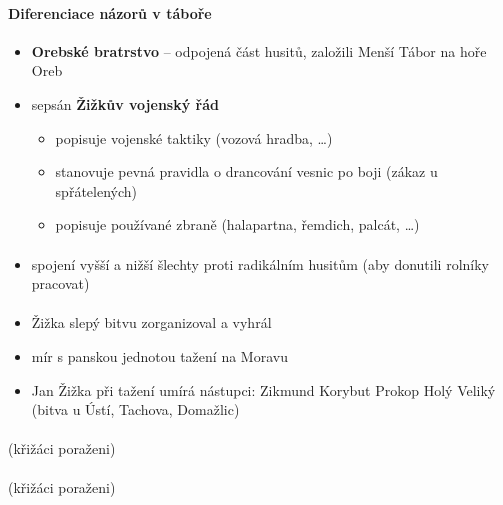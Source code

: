 \paragraph{Diferenciace názorů v táboře}
\begin{itemize}
\item \textbf{Orebské bratrstvo} -- odpojená část husitů, založili Menší Tábor na hoře Oreb
\item sepsán \textbf{Žižkův vojenský řád}
	\begin{itemize}
	\item popisuje vojenské taktiky (vozová hradba, \ldots)
	\item stanovuje pevná pravidla o drancování vesnic po boji (zákaz u spřátelených)
	\item popisuje používané zbraně (halapartna, řemdich, palcát, \ldots)
	\end{itemize}
\end{itemize}



\paragraph{}
\begin{itemize}
\item spojení vyšší a nižší šlechty proti radikálním husitům (aby donutili rolníky pracovat)
\end{itemize}

\paragraph{}
\begin{itemize}
\item Žižka slepý bitvu zorganizoval a vyhrál
\item[\ra] mír s panskou jednotou \ra tažení na Moravu
\item Jan Žižka při tažení umírá \ra nástupci: Zikmund Korybut \ra Prokop Holý Veliký (bitva u Ústí, Tachova, Domažlic)
\end{itemize}

\paragraph{} (křižáci poraženi)
\paragraph{} (křižáci poraženi)
